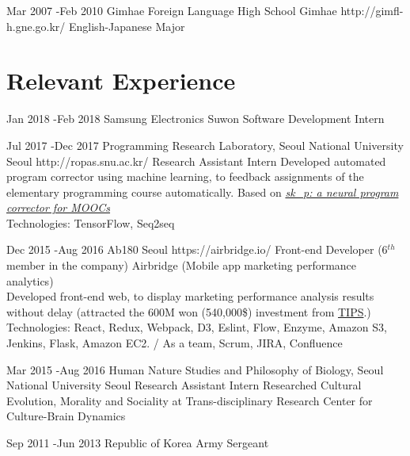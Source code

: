 \documentclass[10pt]{article} %
\begin{document}


\job
{Mar 2007 -}{Feb 2010}
{Gimhae Foreign Language High School}
{Gimhae}
{http://gimfl-h.gne.go.kr/}
{English-Japanese Major}
{}
\fi

\section{Relevant Experience}

\job
{Jan 2018 -}{Feb 2018}
{Samsung Electronics}
{Suwon}
{}
{Software Development Intern}
{}

\job
{Jul 2017 -}{Dec 2017}
{Programming Research Laboratory, Seoul National University}
{Seoul}
{http://ropas.snu.ac.kr/}
{Research Assistant Intern}
{Developed automated program corrector using machine learning, to feedback assignments of the elementary programming course automatically. Based on \textit{\href{https://dl.acm.org/citation.cfm?id=2989222}{
sk\_p: a neural program corrector for MOOCs}}\\
Technologies: TensorFlow, Seq2seq}

\job
{Dec 2015 -}{Aug 2016}
{Ab180}
{Seoul}
{https://airbridge.io/}
{Front-end Developer (6$^{th}$ member in the company)}
{Airbridge (Mobile app marketing performance analytics)\\
Developed front-end web, to display marketing performance analysis results without delay (attracted the 600M won (540,000\$) investment from \href{http://www.jointips.or.kr/}{TIPS}.)\\
Technologies: React, Redux, Webpack, D3, Eslint, Flow, Enzyme, Amazon S3, Jenkins, Flask, Amazon EC2. / As a team, Scrum, JIRA, Confluence}

\if{}
\job
{Mar 2015 -}{Aug 2016}
{Human Nature Studies and Philosophy of Biology, Seoul National University}
{Seoul}
{}
{Research Assistant Intern}
{Researched Cultural Evolution, Morality and Sociality at Trans-disciplinary Research Center for Culture-Brain Dynamics}

\job
{Sep 2011 -}{Jun 2013}
{Republic of Korea Army}
{}
{}
{Sergeant}
\fi

\end{document}
